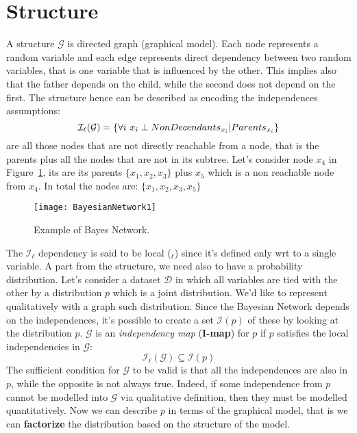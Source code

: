 \section{Structure}
A \BN structure $\mathcal{G}$ is directed graph (graphical model).\newline
Each node represents a random variable and each edge represents direct dependency between two random variables, that is one variable that is influenced by the other. This implies also that the father depends on the child, while the second does not depend on the first. \newline
The structure hence can be described as encoding the independences assumptions:
\[
	\mathcal{I}_\ell (\mathcal{G})=\{\forall i~x_i \perp NonDecendants_{x_i}\vert Parents_{x_i}\}
\]
\NDI are all those nodes that are not directly reachable from a node, that is the parents plus all the nodes that are not in its subtree. Let's consider node $x_4$ in Figure~\ref{fig:BayesianNetwork1}, its \NDI are its parents $\{x_1,x_2,x_3\}$ plus $x_5$ which is a non reachable node from $x_4$. In total the \NDI nodes are: $\{x_1, x_2, x_3, x_5\}$
\begin{figure}
	\centering
	\texttt{[image: BayesianNetwork1]}
	\caption{Example of Bayes Network.}
	\label{fig:BayesianNetwork1}
\end{figure}
The $\mathcal{I}_\ell$ dependency is said to be local (${}_\ell$) since it's defined only wrt to a single variable. \newline
A part from the structure, we need also to have a probability distribution. Let's consider a dataset $\mathcal{D}$ in which all variables are tied with the other by a distribution $p$ which is a joint distribution. We'd like to represent qualitatively with a graph such distribution.\newline
Since the Bayesian Network depends on the independences, it's possible to create a set $\mathcal{I}(p)$ of these by looking at the distribution $p$.\newline
$\mathcal{G}$ is an \textit{independency map} (\textbf{I-map}) for $p$ if $p$ satisfies the local independencies in $\mathcal{G}$:
\[
	\mathcal{I}_\ell(\mathcal{G})\subseteq\mathcal{I}(p)
\]
The sufficient condition for $\mathcal{G}$ to be valid is that all the independences are also in $p$, while the opposite is not always true. Indeed, if some independence from $p$ cannot be modelled into $\mathcal{G}$ via qualitative definition, then they must be modelled quantitatively. \newline
Now we can describe $p$ in terms of the graphical model, that is we can \textbf{factorize} the distribution based on the structure of the model.
